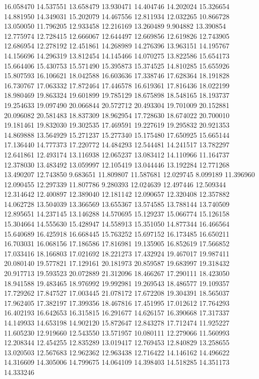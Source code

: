 16.058470
14.537551
13.658479
13.930471
14.404746
14.202024
15.326654
14.881950
14.349031
15.202079
14.467556
12.811934
12.032265
10.866728
13.050050
11.796205
12.933458
12.216169
13.260489
9.904882
13.390854
12.775974
12.728415
12.666067
12.644497
12.669856
12.619826
12.743905
12.686954
12.278192
12.451861
14.268989
14.276396
13.963151
14.195767
14.156696
14.296319
13.812454
14.145466
14.070275
13.822586
15.654173
15.664406
15.430753
15.571490
15.395873
15.374525
14.810285
15.655926
15.807593
16.106621
18.042588
16.603636
17.338746
17.628364
18.191828
16.730767
17.063332
17.872464
17.446578
16.619361
17.816436
18.022199
18.980469
19.863324
19.601899
19.785129
18.675898
18.548165
18.193737
19.254633
19.097490
20.066844
20.572712
20.493304
19.701009
20.152881
20.096082
20.581483
18.837309
18.962954
17.728630
18.674022
20.700010
19.181461
19.832030
19.302535
17.469591
19.227619
19.295832
20.921353
14.869888
13.564929
15.271237
15.277340
15.175480
17.650925
15.665144
17.136440
14.777373
17.220772
14.484293
12.544481
14.241517
13.782297
12.641861
12.493174
13.116938
12.065237
13.083412
14.110966
11.164737
12.378030
13.483492
13.059997
12.105419
13.044446
13.192284
12.771268
13.490207
12.743850
9.683651
11.809807
11.587681
12.029745
8.099189
11.396960
12.090455
12.297339
11.807786
9.280393
12.024639
12.497446
12.509344
12.314642
12.400897
12.389040
12.181142
12.090657
12.320408
12.357882
14.062728
13.504039
13.366569
13.655367
13.574585
13.788144
13.740509
12.895651
14.237145
13.146288
14.570695
15.129237
15.066774
15.126158
15.304664
14.555630
15.428947
14.558913
15.351050
14.877344
16.466564
15.640689
16.425918
16.668445
15.763252
15.697152
16.173485
16.650211
16.703031
16.068156
17.186586
17.816981
19.135905
16.852619
17.566852
17.033416
18.166803
17.021692
18.221273
17.432924
19.467017
19.987411
20.080140
19.577821
17.129161
20.181973
20.859587
19.683997
19.318432
20.917713
19.593523
20.072889
21.312096
18.466267
17.290111
18.423050
18.941588
19.483465
18.976992
19.992981
19.269543
18.486577
19.109357
17.729262
17.847527
17.003445
21.078172
17.672208
19.304391
18.565037
17.962405
17.382197
17.399356
18.467816
17.451995
17.012612
17.764293
16.402193
16.642653
16.315815
16.291677
14.626157
16.390668
17.317337
14.149933
14.653198
14.902120
15.872647
12.843278
17.712474
11.925227
11.605230
12.919660
12.543550
13.571957
10.080111
12.279066
11.560993
12.208344
12.454255
12.835289
13.019417
12.769453
12.840829
13.258655
13.020503
12.567683
12.962362
12.963438
12.716422
14.146162
14.496622
14.316609
14.305006
14.799675
14.064109
14.398403
14.518285
14.351173
14.333246
